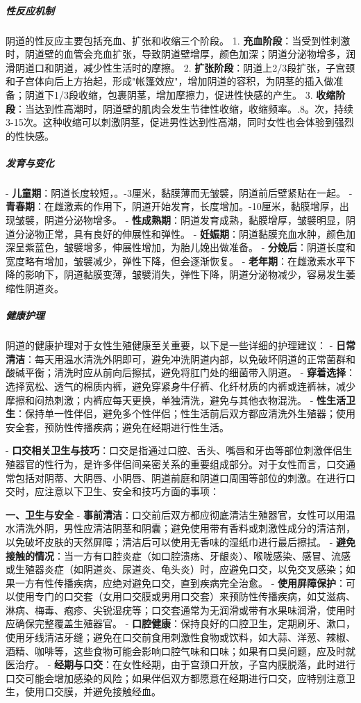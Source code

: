 \begin{enumerate}
\subparagraph{性反应机制}
阴道的性反应主要包括充血、扩张和收缩三个阶段。
1. \textbf{充血阶段}：当受到性刺激时，阴道壁的血管会充血扩张，导致阴道壁增厚，颜色加深；阴道分泌物增多，润滑阴道口和阴道，减少性生活时的摩擦。
2. \textbf{扩张阶段}：阴道上2/3段扩张，子宫颈和子宫体向后上方抬起，形成"帐篷效应"，增加阴道的容积，为阴茎的插入做准备；阴道下1/3段收缩，包裹阴茎，增加摩擦力，促进性快感的产生。
3. \textbf{收缩阶段}：当达到性高潮时，阴道壁的肌肉会发生节律性收缩，收缩频率。.8。次，持续3-15次。这种收缩可以刺激阴茎，促进男性达到性高潮，同时女性也会体验到强烈的性快感。

\subparagraph{发育与变化}
- \textbf{儿童期}：阴道长度较短，。-3厘米，黏膜薄而无皱襞，阴道前后壁紧贴在一起。
- \textbf{青春期}：在雌激素的作用下，阴道开始发育，长度增加。-10厘米，黏膜增厚，出现皱襞，阴道分泌物增多。
- \textbf{性成熟期}：阴道发育成熟，黏膜增厚，皱襞明显，阴道分泌物正常，具有良好的伸展性和弹性。
- \textbf{妊娠期}：阴道黏膜充血水肿，颜色加深呈紫蓝色，皱襞增多，伸展性增加，为胎儿娩出做准备。
- \textbf{分娩后}：阴道长度和宽度略有增加，皱襞减少，弹性下降，但会逐渐恢复。
- \textbf{老年期}：在雌激素水平下降的影响下，阴道黏膜变薄，皱襞消失，弹性下降，阴道分泌物减少，容易发生萎缩性阴道炎。

\subparagraph{健康护理}
阴道的健康护理对于女性生殖健康至关重要，以下是一些详细的护理建议：
- \textbf{日常清洁}：每天用温水清洗外阴即可，避免冲洗阴道内部，以免破坏阴道的正常菌群和酸碱平衡；清洗时应从前向后擦拭，避免将肛门处的细菌带入阴道。
- \textbf{穿着选择}：选择宽松、透气的棉质内裤，避免穿紧身牛仔裤、化纤材质的内裤或连裤袜，减少摩擦和闷热刺激；内裤应每天更换，单独清洗，避免与其他衣物混洗。
- \textbf{性生活卫生}：保持单一性伴侣，避免多个性伴侣；性生活前后双方都应清洗外生殖器；使用安全套，预防性传播疾病；避免在经期进行性生活。

- \textbf{口交相关卫生与技巧}：口交是指通过口腔、舌头、嘴唇和牙齿等部位刺激伴侣生殖器官的性行为，是许多伴侣间亲密关系的重要组成部分。对于女性而言，口交通常包括对阴蒂、大阴唇、小阴唇、阴道前庭和阴道口周围等部位的刺激。在进行口交时，应注意以下卫生、安全和技巧方面的事项：

  \textbf{一、卫生与安全}
  - \textbf{事前清洁}：口交前后双方都应彻底清洁生殖器官，女性可以用温水清洗外阴，男性应清洁阴茎和阴囊；避免使用带有香料或刺激性成分的清洁剂，以免破坏皮肤的天然屏障；清洁后可以使用无香味的湿纸巾进行最后擦拭。
  - \textbf{避免接触的情况}：当一方有口腔炎症（如口腔溃疡、牙龈炎）、喉咙感染、感冒、流感或生殖器炎症（如阴道炎、尿道炎、龟头炎）时，应避免口交，以免交叉感染；如果一方有性传播疾病，应绝对避免口交，直到疾病完全治愈。
  - \textbf{使用屏障保护}：可以使用专门的口交套（女用口交膜或男用口交套）来预防性传播疾病，如艾滋病、淋病、梅毒、疱疹、尖锐湿疣等；口交套通常为无润滑或带有水果味润滑，使用时应确保完整覆盖生殖器官。
  - \textbf{口腔健康}：保持良好的口腔卫生，定期刷牙、漱口，使用牙线清洁牙缝；避免在口交前食用刺激性食物或饮料，如大蒜、洋葱、辣椒、酒精、咖啡等，这些食物可能会影响口腔气味和口味；如果有口臭问题，应及时就医治疗。
  - \textbf{经期与口交}：在女性经期，由于宫颈口开放，子宫内膜脱落，此时进行口交可能会增加感染的风险；如果伴侣双方都愿意在经期进行口交，应特别注意卫生，使用口交膜，并避免接触经血。


\end{enumerate}
